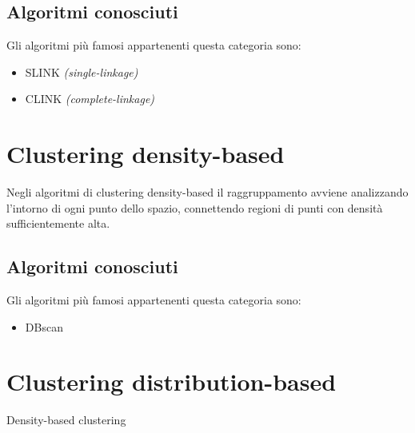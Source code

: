 	\subsection{Algoritmi conosciuti}
		Gli algoritmi più famosi appartenenti questa categoria sono:
		\begin{itemize}
			\item SLINK \emph{(single-linkage)}
		  	\item CLINK \emph{(complete-linkage)}
		\end{itemize}

\section{Clustering density-based}
	Negli algoritmi di clustering density-based il raggruppamento avviene analizzando l'intorno di ogni punto dello spazio, connettendo regioni di punti con densità sufficientemente alta.
	
	\subsection{Algoritmi conosciuti}		
		Gli algoritmi più famosi appartenenti questa categoria sono:
		\begin{itemize}
		  	\item DBscan
		\end{itemize}

\section{Clustering distribution-based}
	Density-based clustering
